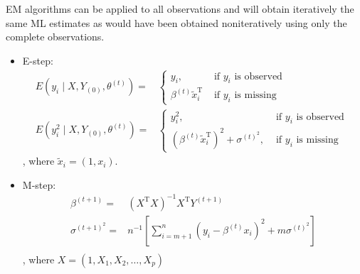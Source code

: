 \begin{example}
	EM algorithms can be applied to all observations and will obtain iteratively the same ML estimates as would have been obtained noniteratively using only the complete observations.

	\begin{itemize}
		\item E-step:
		      \begin{equation}
			      \begin{aligned}
				      E\left(y_{i} \mid X, Y_{(0)}, \theta^{(t)}\right)=     & \left\{\begin{array}{ll}
					                                                                      y_{i},                                 & \text { if } y_{i} \text { is observed } \\
					                                                                      \beta^{(t)} \tilde{x}_{i}^{\mathrm{T}} & \text { if } y_{i} \text { is missing }
				                                                                      \end{array}\right.                                                                                                          \\
				      E\left(y_{i}^{2} \mid X, Y_{(0)}, \theta^{(t)}\right)= & \left\{\begin{array}{ll}
					                                                                      y_{i}^{2},                                                                & \text { if } y_{i} \text { is observed } \\
					                                                                      \left(\beta^{(t)} \tilde{x}_{i}^{\mathrm{T}}\right)^{2}+\sigma^{(t)^{2}}, & \text { if } y_{i} \text { is missing }
				                                                                      \end{array}\right.
			      \end{aligned}
		      \end{equation}
		      , where $\tilde{x}_{i}=(1,x_{i})$.
		\item M-step:
		      \begin{equation}
			      \begin{aligned}
				      \beta^{(t+1)}=      & \left(X^{\mathrm{T}} X\right)^{-1} X^{\mathrm{T}} Y^{(t+1)}                                    \\
				      \sigma^{(t+1)^{2}}= & n^{-1}\left[\sum_{i=m+1}^{n}\left(y_{i}-\beta^{(t)} x_{i}\right)^{2}+m \sigma^{(t)^{2}}\right] \\
			      \end{aligned}
		      \end{equation}
		      , where $X=(1,X_1,X_2,\ldots,X_p)$
	\end{itemize}
\end{example}

